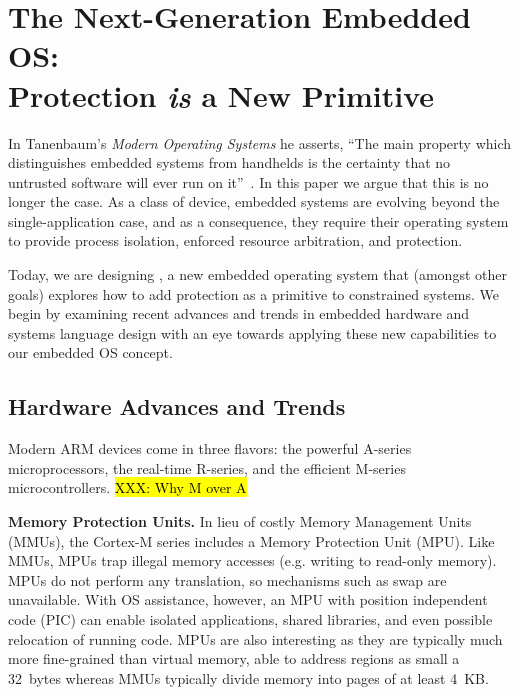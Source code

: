 \section{The Next-Generation Embedded OS:\\Protection \emph{is} a New Primitive}
\label{protection}

In Tanenbaum's \emph{Modern Operating Systems} he asserts, ``The main property
which distinguishes embedded systems from handhelds is the certainty that no
untrusted software will ever run on it''~\cite{tanenbaum}. In this paper we
argue that this is no longer the case. As a class of device, embedded systems
are evolving beyond the single-application case, and as a consequence, they
require their operating system to provide process isolation, enforced resource
arbitration, and protection.

Today, we are designing \name, a new embedded operating system that (amongst
other goals) explores how to add protection as a primitive to constrained
systems. We begin by examining recent advances and trends in embedded
hardware and systems language design with an eye towards applying these
new capabilities to our embedded OS concept.


%
%

\subsection{Hardware Advances and Trends}

Modern ARM devices come in three flavors: the powerful A-series
microprocessors, the real-time R-series, and the efficient M-series
microcontrollers.
\hl{XXX: Why M over A}

{\bf Memory Protection Units.}
In lieu of costly Memory Management Units (MMUs), the Cortex-M series includes
a Memory Protection Unit (MPU). Like MMUs, MPUs trap illegal memory accesses
(e.g. writing to read-only memory). MPUs do not perform any translation, so
mechanisms such as swap are unavailable. With OS assistance, however, an MPU
with position independent code (PIC) can enable isolated applications, shared
libraries, and even possible relocation of running code.
MPUs are also interesting as they are typically much more fine-grained than
virtual memory, able to address regions as small a 32~bytes whereas MMUs
typically divide memory into pages of at least 4~KB.

